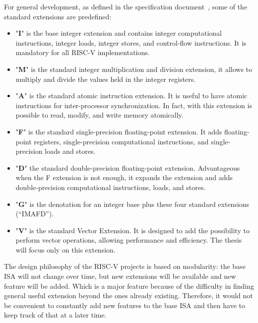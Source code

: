 For general development, as defined in the specification document~\cite{RISC-V-Instruction-Set-Manual}, some of the standard extensions are predefined:
\begin{itemize}
    \item "\textbf{I}" is the base integer extension and contains integer computational instructions, integer loads, integer stores, and control-ﬂow instructions. It is mandatory for all RISC-V implementations.
    
    \item "\textbf{M}" is the standard integer multiplication and division extension, it allows to multiply and divide the values held in the integer registers.
    
    \item "\textbf{A}" is the standard atomic instruction extension. It is useful to have atomic instructions for inter-processor synchronization. In fact, with this extension is possible to read, modify, and write memory atomically. 
    
    \item "\textbf{F}" is the standard single-precision ﬂoating-point extension. It adds ﬂoating-point registers, single-precision computational instructions, and single-precision loads and stores. 
    
    \item "\textbf{D}" the standard double-precision ﬂoating-point extension. Advantageous when the F extension is not enough, it expands the extension and adds double-precision computational instructions, loads, and stores.
    
    \item "\textbf{G}" is the denotation for an integer base plus these four standard extensions (“IMAFD”).
    
    \item "\textbf{V}" is the standard Vector Extension. It is designed to add the possibility to perform vector operations, allowing performance and efficiency. The thesis will focus only on this extension.
\end{itemize}


The design philosophy of the RISC-V projects is based on modularity: the base ISA will not change over time, but new extensions will be available and new feature will be added. Which is a major feature because of the difficulty in finding general useful extension beyond the ones already existing. Therefore, it would not be convenient to constantly add new features to the base ISA and then have to keep track of that at a later time.


